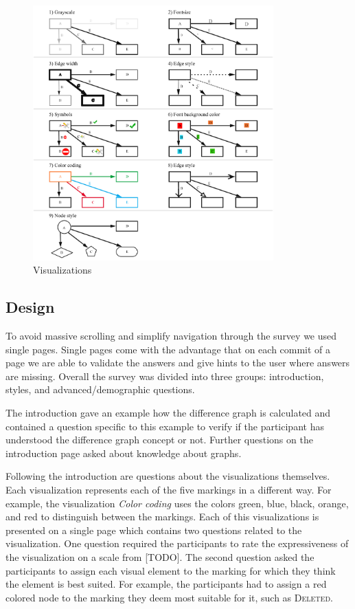 \documentclass{llncs}
\begin{document}
\begin{figure}
	\centering
	\includegraphics[width=350px]{Images/Overview.PNG}
	\caption{Visualizations}
	\label{fig:visualizations}
\end{figure}


\subsection{Design} %
\label{sec:Design}
To avoid massive scrolling and simplify navigation through the survey we used single pages. Single pages come with the advantage that on each commit of a page we are able to validate the answers and give hints to the user where answers are missing. Overall the survey was divided into three groups: introduction, styles, and advanced/demographic questions.

The introduction gave an example how the difference graph is calculated and contained a question specific to this example to verify if the participant has understood the difference graph concept or not. Further questions on the introduction page asked about knowledge about graphs.  

Following the introduction are questions about the visualizations themselves. Each visualization represents each of the five markings in a different way. For example, the visualization \emph{Color coding} uses the colors green, blue, black, orange, and red to distinguish between the markings. Each of this visualizations is presented on a single page which contains two questions related to the visualization. One question required the participants to rate the expressiveness of the visualization on a scale from [TODO]. The second question asked the participants to assign each visual element to the marking for which they think the element is best suited. For example, the participants had to assign a red colored node to the marking they deem most suitable for it, such as \textsc{Deleted}.
\end{document}
